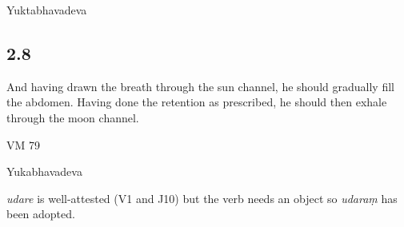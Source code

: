 \begin{ekdosis}
\begin{testimonia}[hp02_007]
Yuktabhavadeva

\begin{versinnote}
\end{versinnote}
\end{testimonia}

\begin{philcomm}[hp02_007]

\end{philcomm}

\subsection*{2.8}
\begin{translation}[hp02_008]
And having drawn the breath through the sun channel, he should gradually fill the abdomen. Having done the retention as prescribed, he should then exhale through the moon channel.
\end{translation}

\begin{sources}[hp02_008]
VM 79

\begin{versinnote}
\end{versinnote}
\end{sources}

\begin{testimonia}[hp02_008]
Yukabhavadeva

\begin{versinnote}
\end{versinnote}
\end{testimonia}

\begin{philcomm}[hp02_008]
\emph{udare} is well-attested (V1 and J10) but the verb needs an object so \emph{udaraṃ} has been adopted.
\end{philcomm}


\end{ekdosis}
